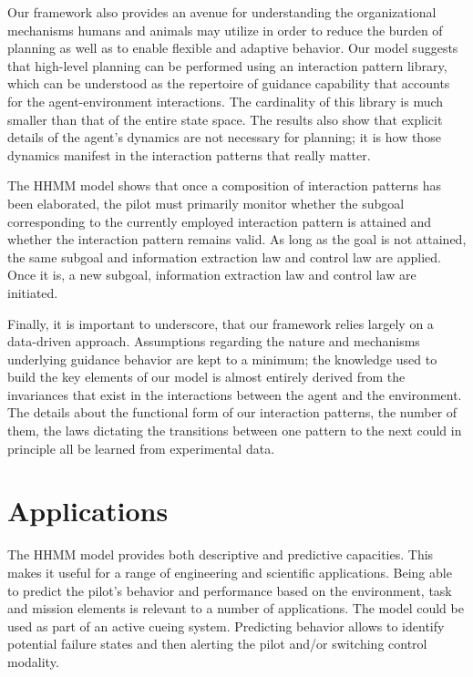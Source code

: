 \documentclass[journal]{IEEEtran}
\begin{document}
Our framework also provides an avenue for understanding the organizational mechanisms humans and animals may utilize in order to reduce the burden of planning as well as to enable flexible and adaptive behavior. Our model suggests that high-level planning can be performed using an interaction pattern library, which can be understood as the repertoire of guidance capability that accounts for the agent-environment interactions. The cardinality of this library is much smaller than that of the entire state space. The results also show that explicit details of the agent's dynamics are not necessary for planning; it is how those dynamics manifest in the interaction patterns that really matter. 

The HHMM model shows that once a composition of interaction patterns has been elaborated, the pilot must primarily monitor whether the subgoal corresponding to the currently employed interaction pattern is attained and whether the interaction pattern remains valid. As long as the goal is not attained, the same subgoal and information extraction law  and control law  are applied. Once it is, a new subgoal, information extraction law  and control law  are initiated. 



Finally, it is important to underscore, that our framework relies largely on a data-driven approach. Assumptions regarding the nature and mechanisms underlying guidance behavior are kept to a minimum; the knowledge used to build the key elements of our model is almost entirely derived from the invariances that exist in the interactions between the agent and the environment. The details about the functional form of our interaction patterns, the number of them, the laws dictating the transitions between one pattern to the next could in principle all be learned from experimental data.  


\section{Applications}

The HHMM model provides both descriptive and predictive capacities. This makes it useful for a range of engineering and scientific applications.  Being able to predict the pilot's behavior and performance based on the environment, task and mission elements is relevant to a number of applications. The model could be used as part of an active cueing system. Predicting behavior allows to identify potential failure states and then alerting the pilot and/or switching control modality.  
\end{document}
